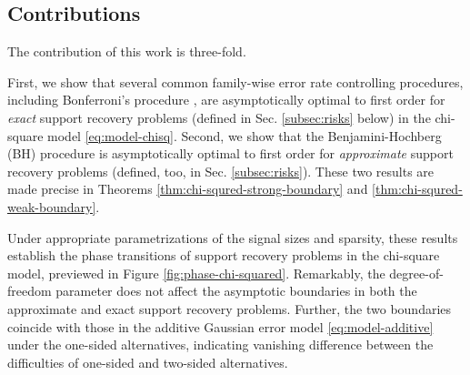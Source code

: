 \subsection{Contributions}

The contribution of this work is three-fold.

First, we show that several common family-wise error rate controlling procedures, including Bonferroni's procedure \cite{dunn1961multiple}, are asymptotically optimal to first order for \emph{exact} support recovery problems (defined in Sec. \ref{subsec:risks} below) in the chi-square model \eqref{eq:model-chisq}.
Second, we show that the Benjamini-Hochberg (BH) procedure \cite{benjamini1995controlling} is asymptotically optimal to first order for \emph{approximate} support recovery problems (defined, too, in Sec. \ref{subsec:risks}).
These two results are made precise in Theorems \ref{thm:chi-squred-strong-boundary} and \ref{thm:chi-squred-weak-boundary}.

Under appropriate parametrizations of the signal sizes and sparsity, these results establish the phase transitions of support recovery problems in the chi-square model, previewed in Figure \ref{fig:phase-chi-squared}.
Remarkably, the degree-of-freedom parameter does not affect the asymptotic boundaries in both the approximate and exact support recovery problems.
Further, the two boundaries coincide with those in the additive Gaussian error model \eqref{eq:model-additive} under the one-sided alternatives, indicating vanishing difference between the difficulties of one-sided and two-sided alternatives.


